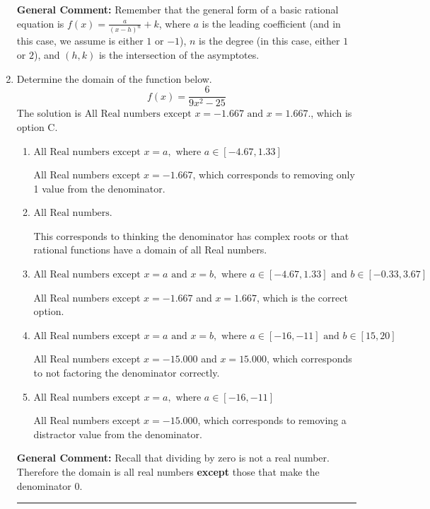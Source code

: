 \documentclass{extbook}[14pt]
\newcommand{\litem}[1]{\item #1

\rule{\textwidth}{0.4pt}}
\begin{document}
\begin{enumerate}
{\textbf{General Comment:} Remember that the general form of a basic rational equation is $ f(x) = \frac{a}{(x-h)^n} + k$, where $a$ is the leading coefficient (and in this case, we assume is either $1$ or $-1$), $n$ is the degree (in this case, either $1$ or $2$), and $(h, k)$ is the intersection of the asymptotes.
}
\litem{
Determine the domain of the function below.
\[ f(x) = \frac{6}{9x^{2} -25} \]The solution is \( \text{All Real numbers except } x = -1.667 \text{ and } x = 1.667. \), which is option C.\begin{enumerate}[label=\Alph*.]
\item \( \text{All Real numbers except } x = a, \text{ where } a \in [-4.67, 1.33] \)

All Real numbers except $x = -1.667$, which corresponds to removing only 1 value from the denominator.
\item \( \text{All Real numbers.} \)

This corresponds to thinking the denominator has complex roots or that rational functions have a domain of all Real numbers.
\item \( \text{All Real numbers except } x = a \text{ and } x = b, \text{ where } a \in [-4.67, 1.33] \text{ and } b \in [-0.33, 3.67] \)

All Real numbers except $x = -1.667$ and $x = 1.667$, which is the correct option.
\item \( \text{All Real numbers except } x = a \text{ and } x = b, \text{ where } a \in [-16, -11] \text{ and } b \in [15, 20] \)

All Real numbers except $x = -15.000$ and $x = 15.000$, which corresponds to not factoring the denominator correctly.
\item \( \text{All Real numbers except } x = a, \text{ where } a \in [-16, -11] \)

All Real numbers except $x = -15.000$, which corresponds to removing a distractor value from the denominator.
\end{enumerate}

\textbf{General Comment:} Recall that dividing by zero is not a real number. Therefore the domain is all real numbers \textbf{except} those that make the denominator 0.
}
\end{enumerate}
\end{document}
